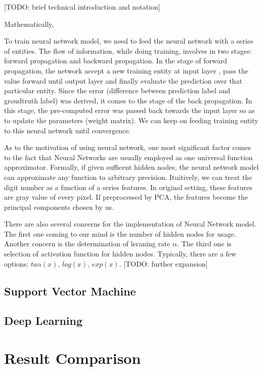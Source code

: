 \documentclass{article} %
\begin{document}
{\large [TODO: brief technical introduction and notation]}

Mathematically, 

To train neural network model, we need to feed the neural network with a
series of entities. The flow of information, while doing training,
involves in two stages: forward propagation and backward propagation.  In the
stage of forward propagation, the network accept a new training entity at input layer
, pass the value forward until output layer and finally evaluate the
prediction over that particular entity. Since the error (difference
between prediction label and groudtruth label) was derived, it comes to the
stage of the back propagation. In this stage, the pre-computed error was
passed back towards the input layer so as to update the parameters (weight
matrix). We can keep on feeding training entity to this neural network until
convergence.

As to the motivation of using neural network, one most significant factor
comes to the fact that Neural Networks are usually employed as one universal
function approximator. Formally, if given sufficent hidden nodes, the neural
network model can approximate any function to arbitrary precision. Ituitively,
we can treat the digit number as a function of a series features. In original
setting, these features are gray value of every pixel. If preprocessed by PCA,
the features become the principal components chosen by us. 

There are also several concerns for the implementation of Neural Network model.
The first one coming to our mind is the number of hidden nodes for usage.
Another concern is the determination of leraning rate $\alpha$. The third one
is selection of activation function for hidden nodes. Typically, there are a
few options: $tan(x)$, $log(x)$, $exp(x)$.
{\large [TODO: further expansion]}


\subsection{Support Vector Machine}


\subsection{Deep Learning}


\section{Result Comparison} \label{Comparison}
\end{document}
